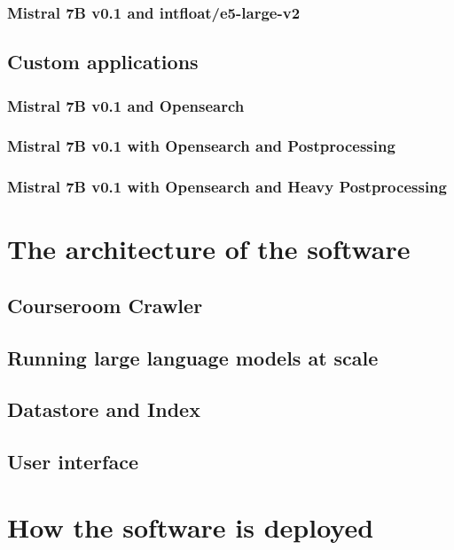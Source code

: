 \subsubsection{Mistral 7B v0.1 and intfloat/e5-large-v2}


\subsection{Custom applications}


\subsubsection{Mistral 7B v0.1 and Opensearch}


\subsubsection{Mistral 7B v0.1 with Opensearch and Postprocessing}


\subsubsection{Mistral 7B v0.1 with Opensearch and Heavy Postprocessing}


\section{The architecture of the software}





\subsection{Courseroom Crawler}


\subsection{Running large language models at scale}


\subsection{Datastore and Index}


\subsection{User interface}


\section{How the software is deployed}


